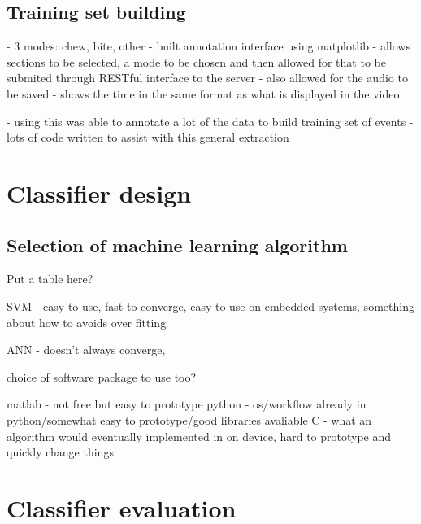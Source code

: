 \subsection{Training set building}

- 3 modes: chew, bite, other
- built annotation interface using matplotlib
	- allows sections to be selected, a mode to be chosen and then allowed for that to be submited through RESTful interface to the server
- also allowed for the audio to be saved
- shows the time in the same format as what is displayed in the video

- using this was able to annotate a lot of the data to build training set of events
- lots of code written to assist with this general extraction

\section{Classifier design}

\subsection{Selection of machine learning algorithm}

Put a table here?

SVM - easy to use, fast to converge, easy to use on embedded systems, something about how to avoids over fitting

ANN - doesn't always converge, 


choice of software package to use too?

matlab - not free but easy to prototype
python - os/workflow already in python/somewhat easy to prototype/good libraries avaliable
C - what an algorithm would eventually implemented in on device, hard to prototype and quickly change things


\section{Classifier evaluation}
